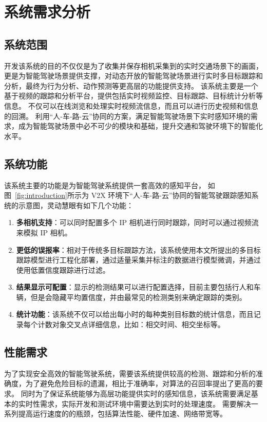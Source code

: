 \section{系统需求分析}

\subsection{系统范围}
开发该系统的目的不仅仅是为了收集并保存相机采集到的实时交通场景下的画面，更是为智能驾驶场景提供支撑，对动态开放的智能驾驶场景进行实时多目标跟踪和分析，最终为行为分析、动作预测等更高层的功能提供支持。
该系统主要是一个基于视频的跟踪和分析平台，提供包括实时视频监控、目标跟踪、目标统计分析等信息。
不仅可以在线浏览和处理实时视频流信息，而且可以进行历史视频和信息的回溯。
利用“人-车-路-云”协同的方案，满足智能驾驶场景下实时感知环境的需求，成为智能驾驶场景中必不可少的模块和基础，提升交通和驾驶环境下的智能化水平。


\subsection{系统功能}
该系统主要的功能是为智能驾驶系统提供一套高效的感知平台，
如图~\ref{fig:introduction}所示为 V2X 环境下“人-车-路-云”协同的智能驾驶跟踪感知系统的示意图，灵动慧眼有如下几个功能：
\begin{enumerate} 
	\item \textbf{多相机支持}：可以同时配置多个 IP 相机进行同时跟踪，同时可以通过视频流来模拟 IP 相机。
	
	\item \textbf{更低的误报率}：相对于传统多目标跟踪方法，该系统使用本文所提出的多目标跟踪模型进行工程化部署，通过适量采集并标注的数据进行模型微调，并通过使用低置信度跟踪进行过滤。
	
	\item \textbf{结果显示可配置}：显示的检测结果可以进行配置选择，目前主要包括行人和车辆，但是会隐藏平均置信度，并由最常见的检测类别来确定跟踪的类别。
	
	\item \textbf{统计功能}：该系统不仅可以给出每小时的每种类别目标数的统计信息，而且记录每个计数对象交叉点详细信息，比如：相交时间、相交坐标等。	
\end{enumerate}



\subsection{性能需求}
为了实现安全高效的智能驾驶系统，需要该系统提供较高的检测、跟踪和分析的准确度，为了避免危险目标的遗漏，相比于准确率，对算法的召回率提出了更高的要求。
同时为了保证系统能够为高层功能提供实时的感知信息，该系统需要满足基本的实时性需求，实际开发和测试环境中需要达到实时的处理速度。
需要解决一系列提高运行速度的的瓶颈，包括算法性能、硬件加速、网络带宽等。

